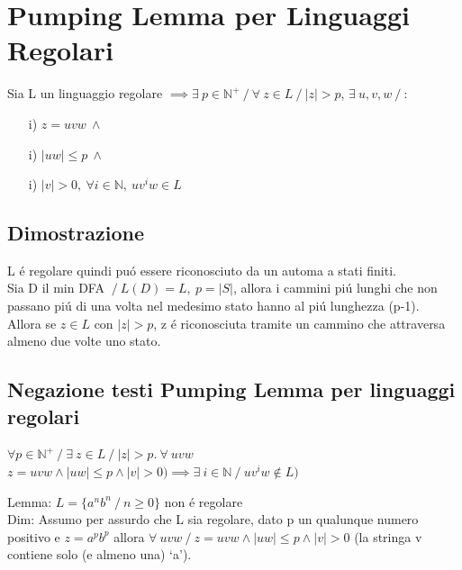 \section{Pumping Lemma per Linguaggi Regolari}

Sia L un linguaggio regolare
$\implies \exists\ p \in \mathbb{N}^+ \ / \ \forall\ z \in L \ / \ |z| > p$,
$\exists\ u,v,w \ / \ $:

\begin{itemize}
    \item[i)] $z = uvw\ \land$\\
    \item[i)] $|uw| \leq p\ \land$\\
    \item[i)] $|v| > 0,\ \forall i \in \mathbb{N},\ u v^i w \in L$\\
\end{itemize}

\subsection{Dimostrazione}
L \'e regolare quindi pu\'o essere riconosciuto da un automa a stati finiti.\\
Sia D il min DFA $\ / \ L(D) = L,\ p = |S|$, allora i cammini pi\'u lunghi che non passano pi\'u di una volta nel medesimo 
stato hanno al pi\'u lunghezza (p-1).\\
Allora se $z \in L$ con $|z|>p$, z \'e riconosciuta tramite un cammino che attraversa almeno due volte uno stato. \\

\subsection{Negazione testi Pumping Lemma per linguaggi regolari}
$\forall p \in \mathbb{N}^+ \ / \ \exists\ z \in L \ / \ |z| > p.\ \forall\ uvw $
$z = uvw \land |uw| \leq p \land |v| > 0) \implies \exists\ i \in \mathbb{N} \ / \ u v^i w \not\in L) $

Lemma: $L=\{a^nb^n \ / \ n \geq 0\}$ non \'e regolare\\
Dim: Assumo per assurdo che L sia regolare, dato p un qualunque numero positivo e $z= a^p b^p $ allora
$\forall\ uvw \ / \ z = uvw \land |uw| \leq p \land |v| > 0$ (la stringa v contiene solo (e almeno una) \lq a\rq ).

